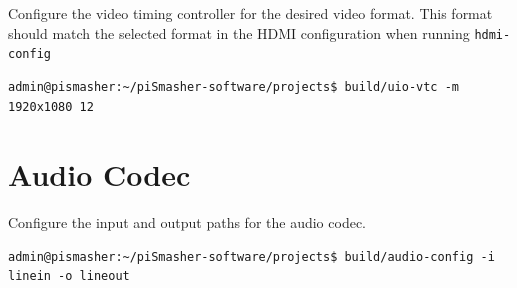 \documentclass[sfsidenotes, justified]{tufte-handout}
\begin{document}
	Configure the video timing controller for the desired video format. This format should match the selected format in the HDMI configuration when running \texttt{hdmi-config}

\begin{fullwidth}
\begin{lstlisting}
admin@pismasher:~/piSmasher-software/projects$ build/uio-vtc -m 1920x1080 12
\end{lstlisting}
\end{fullwidth}

\section{Audio Codec}

Configure the input and output paths for the audio codec.

\begin{fullwidth}
\begin{lstlisting}
admin@pismasher:~/piSmasher-software/projects$ build/audio-config -i linein -o lineout
\end{lstlisting}
\end{fullwidth}
\end{document}
